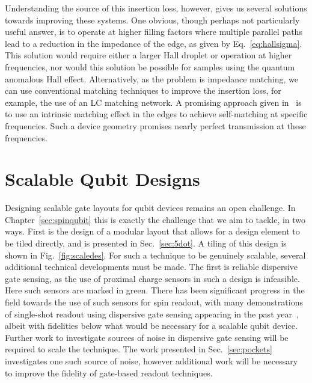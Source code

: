 Understanding the source of this insertion loss, however, gives us several solutions towards improving these systems. One obvious, though perhaps
not particularly useful answer, is to operate at higher filling factors where multiple parallel paths lead to a reduction in the impedance of the edge, as
given by Eq.~\ref{eq:hallsigma}. This solution would require either a larger Hall droplet or operation at higher frequencies, nor would this solution
be possible for samples using the quantum anomalous Hall effect. Alternatively, as the problem is impedance matching, we can use conventional matching
techniques to improve the insertion loss, for example, the use of an LC matching network. A promising approach given in~\cite{bosco2016self} is to use
an intrinsic matching effect in the edges to achieve self-matching at specific frequencies. Such a device geometry promises nearly perfect transmission at these
frequencies.

\section{Scalable Qubit Designs}
Designing scalable gate layouts for qubit devices remains an open challenge. In Chapter~\ref{sec:spinqubit} this is exactly the challenge that we aim to
tackle, in two ways. First is the design of a modular layout that allows for a design element to be tiled directly, and is presented in Sec.~\ref{sec:5dot}.
A tiling of this design is shown in Fig.~\ref{fig:scaledes}. For such a technique to be genuinely scalable, several additional technical developments
must be made. The first is reliable dispersive gate sensing, as the use of proximal charge sensors in such a design is infeasible. Here such sensors are marked in green.
There has been significant progress in the field towards the use of such sensors for spin readout, with many demonstrations of single-shot readout using dispersive
gate sensing appearing in the past year~\cite{Nnano_dzurak,PhysRevApplied.11.044061}, albeit with fidelities below what would be necessary for a scalable qubit
device. Further work to investigate sources of noise in dispersive gate sensing will be required to scale the technique. The work presented in Sec.~\ref{sec:pockets}
investigates one such source of noise, however additional work will be necessary to improve the fidelity of gate-based readout techniques.

